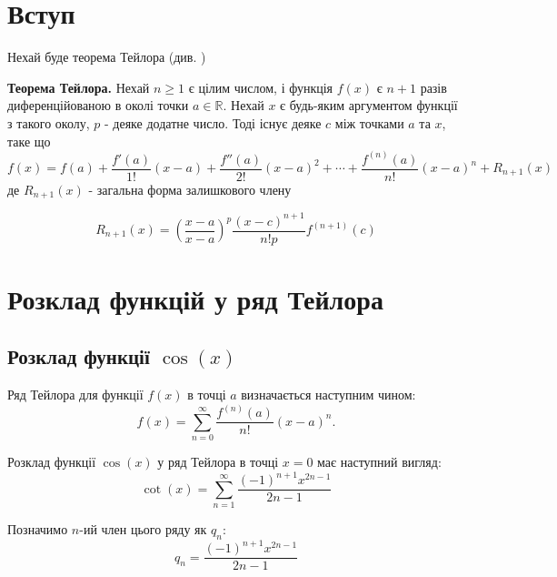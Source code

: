 



	
	\section{Вступ}
	Нехай буде теорема Тейлора (див. \cite{weisstein})
	\begin{theorem}\label{ttt1}
		\textbf{Теорема Тейлора.} Нехай $n\geq1$ є цілим числом, і функція $f(x)$ є $n+1$ разів диференційованою в околі точки $a\in\mathbb{R}$. Нехай $x$ є будь-яким аргументом функції з такого околу, $p$ - деяке додатне число. Тоді існує деяке $c$ між точками $a$ та $x$, таке що
		\begin{equation}\label{mvm}
			f(x)=f(a)+\frac{f'(a)}{1!}(x-a)+\frac{f''(a)}{2!}(x-a)^2+\cdots+\frac{f^{(n)}(a)}{n!}(x-a)^n+R_{n+1}(x)
		\end{equation}
		де $R_{n+1}(x)$ - загальна форма залишкового члену
		
		\begin{equation}\label{xcxxxs}
			R_{n+1}(x)=\left(\frac{x-a}{x-a}\right)^p \frac{(x-c)^{n+1}}{n!p}f^{(n+1)}(c)
		\end{equation}

		\end{theorem}
	\section{Розклад функцій у ряд Тейлора}
	
	\subsection{Розклад функції \( \cos(x) \)}
	
	\begin{definition}
		Ряд Тейлора для функції \( f(x) \) в точці \( a \) визначається наступним чином:
		\[
		f(x) = \sum_{n=0}^{\infty} \frac{f^{(n)}(a)}{n!}(x-a)^n.
		\]
	\end{definition}
	
	\begin{theorem}
		Розклад функції \( \cos(x) \) у ряд Тейлора в точці \( x = 0 \) має наступний вигляд:
			\begin{equation} \label{eq:cot_general}
	\cot(x) = \sum_{n=1}^{\infty} \frac{(-1)^{n+1} x^{2n-1}}{2n-1} 
			\end{equation}
	\end{theorem}
	
	\begin{definition}
		Позначимо \( n \)-ий член цього ряду як \( q_n \):
	\begin{equation} \label{eq:q_sum_n}
	q_n = \frac{(-1)^{n+1} x^{2n-1}}{2n-1}
	\end{equation}
	\end{definition}
	
